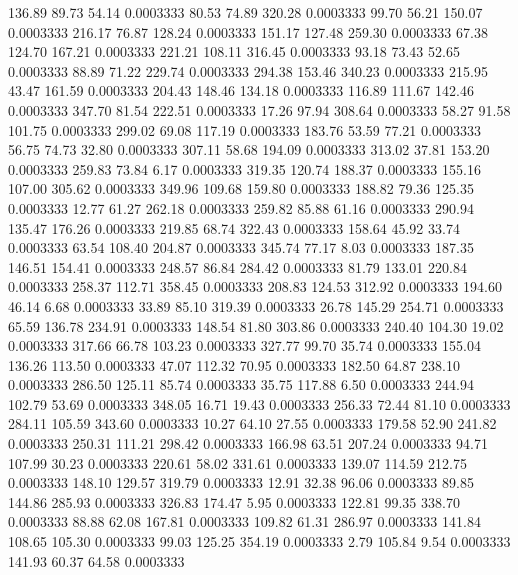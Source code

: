  136.89   89.73   54.14   0.0003333
  80.53   74.89  320.28   0.0003333
  99.70   56.21  150.07   0.0003333
 216.17   76.87  128.24   0.0003333
 151.17  127.48  259.30   0.0003333
  67.38  124.70  167.21   0.0003333
 221.21  108.11  316.45   0.0003333
  93.18   73.43   52.65   0.0003333
  88.89   71.22  229.74   0.0003333
 294.38  153.46  340.23   0.0003333
 215.95   43.47  161.59   0.0003333
 204.43  148.46  134.18   0.0003333
 116.89  111.67  142.46   0.0003333
 347.70   81.54  222.51   0.0003333
  17.26   97.94  308.64   0.0003333
  58.27   91.58  101.75   0.0003333
 299.02   69.08  117.19   0.0003333
 183.76   53.59   77.21   0.0003333
  56.75   74.73   32.80   0.0003333
 307.11   58.68  194.09   0.0003333
 313.02   37.81  153.20   0.0003333
 259.83   73.84    6.17   0.0003333
 319.35  120.74  188.37   0.0003333
 155.16  107.00  305.62   0.0003333
 349.96  109.68  159.80   0.0003333
 188.82   79.36  125.35   0.0003333
  12.77   61.27  262.18   0.0003333
 259.82   85.88   61.16   0.0003333
 290.94  135.47  176.26   0.0003333
 219.85   68.74  322.43   0.0003333
 158.64   45.92   33.74   0.0003333
  63.54  108.40  204.87   0.0003333
 345.74   77.17    8.03   0.0003333
 187.35  146.51  154.41   0.0003333
 248.57   86.84  284.42   0.0003333
  81.79  133.01  220.84   0.0003333
 258.37  112.71  358.45   0.0003333
 208.83  124.53  312.92   0.0003333
 194.60   46.14    6.68   0.0003333
  33.89   85.10  319.39   0.0003333
  26.78  145.29  254.71   0.0003333
  65.59  136.78  234.91   0.0003333
 148.54   81.80  303.86   0.0003333
 240.40  104.30   19.02   0.0003333
 317.66   66.78  103.23   0.0003333
 327.77   99.70   35.74   0.0003333
 155.04  136.26  113.50   0.0003333
  47.07  112.32   70.95   0.0003333
 182.50   64.87  238.10   0.0003333
 286.50  125.11   85.74   0.0003333
  35.75  117.88    6.50   0.0003333
 244.94  102.79   53.69   0.0003333
 348.05   16.71   19.43   0.0003333
 256.33   72.44   81.10   0.0003333
 284.11  105.59  343.60   0.0003333
  10.27   64.10   27.55   0.0003333
 179.58   52.90  241.82   0.0003333
 250.31  111.21  298.42   0.0003333
 166.98   63.51  207.24   0.0003333
  94.71  107.99   30.23   0.0003333
 220.61   58.02  331.61   0.0003333
 139.07  114.59  212.75   0.0003333
 148.10  129.57  319.79   0.0003333
  12.91   32.38   96.06   0.0003333
  89.85  144.86  285.93   0.0003333
 326.83  174.47    5.95   0.0003333
 122.81   99.35  338.70   0.0003333
  88.88   62.08  167.81   0.0003333
 109.82   61.31  286.97   0.0003333
 141.84  108.65  105.30   0.0003333
  99.03  125.25  354.19   0.0003333
   2.79  105.84    9.54   0.0003333
 141.93   60.37   64.58   0.0003333
